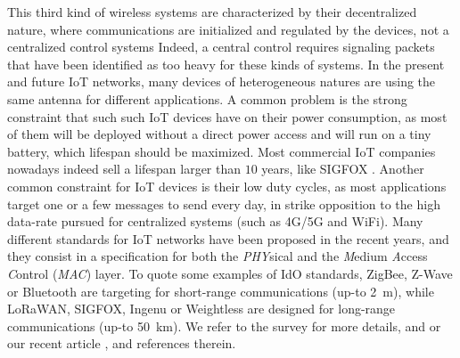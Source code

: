 This third kind of wireless systems are characterized by their decentralized nature,
where communications are initialized and regulated by the devices, not a centralized control systems
Indeed, a central control requires signaling packets that have been identified as too heavy for these kinds of systems.
In the present and future IoT networks, many devices of heterogeneous natures are using the same antenna for different applications.
A common problem is the strong constraint that such such IoT devices have on their power consumption, as most of them will be deployed without a direct power access and will run on a tiny battery, which lifespan should be maximized.
Most commercial IoT companies nowadays indeed sell a lifespan larger than $10$ years, like SIGFOX \cite{Centenaro16}.
Another common constraint for IoT devices is their low duty cycles, as most applications target one or a few messages to send every day, in strike opposition to the high data-rate pursued for centralized systems (such as 4G/5G and WiFi).
%
Many different standards for IoT networks have been proposed in the recent years,
and they consist in a specification for both the \emph{PHY}sical
and the \emph{M}edium \emph{A}ccess \emph{C}ontrol (\emph{MAC}) layer.
To quote some examples of IdO standards, ZigBee, Z-Wave or Bluetooth are targeting for short-range communications (up-to \SI{2}{\meter}), while LoRaWAN, SIGFOX, Ingenu or Weightless are designed for long-range communications (up-to \SI{50}{\kilo\meter}).
We refer to the survey \cite{Centenaro16} for more details, and \cite{Azari18} or our recent article \cite{MoyBesson2019}, and references therein.



